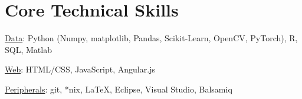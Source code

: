 \documentclass[a4paper,10pt]{article}
\begin{document}
\section{Core Technical Skills}

\underline{Data}: Python (Numpy, matplotlib, Pandas, Scikit-Learn, OpenCV, PyTorch), R, SQL, Matlab

\underline{Web}: HTML/CSS, JavaScript, Angular.js

\underline{Peripherals}: git, *nix, LaTeX, Eclipse, Visual Studio, Balsamiq
\end{document}

